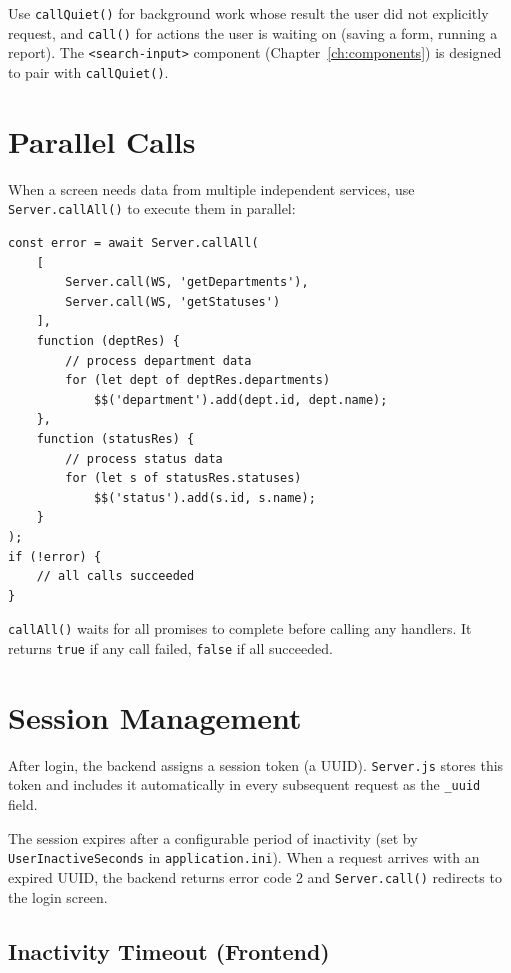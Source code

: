 \begin{tipbox}
Use \texttt{callQuiet()} for background work whose result the user did not explicitly request, and \texttt{call()} for actions the user is waiting on (saving a form, running a report).  The \texttt{<search-input>} component (Chapter~\ref{ch:components}) is designed to pair with \texttt{callQuiet()}.
\end{tipbox}

\section{Parallel Calls}
\label{sec:sc-parallel}

When a screen needs data from multiple independent services, use \texttt{Server.callAll()} to execute them in parallel:

\begin{lstlisting}[style=javascript]
const error = await Server.callAll(
    [
        Server.call(WS, 'getDepartments'),
        Server.call(WS, 'getStatuses')
    ],
    function (deptRes) {
        // process department data
        for (let dept of deptRes.departments)
            $$('department').add(dept.id, dept.name);
    },
    function (statusRes) {
        // process status data
        for (let s of statusRes.statuses)
            $$('status').add(s.id, s.name);
    }
);
if (!error) {
    // all calls succeeded
}
\end{lstlisting}

\noindent
\texttt{callAll()} waits for all promises to complete before calling any handlers.  It returns \texttt{true} if any call failed, \texttt{false} if all succeeded.

\section{Session Management}
\label{sec:sc-sessions}

After login, the backend assigns a session token (a UUID).  \texttt{Server.js} stores this token and includes it automatically in every subsequent request as the \texttt{\_uuid} field.

The session expires after a configurable period of inactivity (set by \texttt{UserInactiveSeconds} in \texttt{application.ini}).  When a request arrives with an expired UUID, the backend returns error code 2 and \texttt{Server.call()} redirects to the login screen.

\subsection{Inactivity Timeout (Frontend)}

